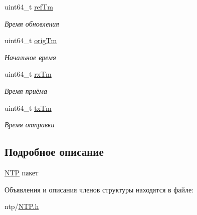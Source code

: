 \begin{DoxyCompactItemize}
\item 
\mbox{\label{structntp__packet_a14e1f9d8c88659f372942fe7e016df75}} 
uint64\+\_\+t \mbox{\hyperlink{structntp__packet_a14e1f9d8c88659f372942fe7e016df75}{ref\+Tm}}
\begin{DoxyCompactList}\small\item\em Время обновления \end{DoxyCompactList}\item 
\mbox{\label{structntp__packet_aa6c139817877455661b10e09375a7f7b}} 
uint64\+\_\+t \mbox{\hyperlink{structntp__packet_aa6c139817877455661b10e09375a7f7b}{orig\+Tm}}
\begin{DoxyCompactList}\small\item\em Начальное время \end{DoxyCompactList}\item 
\mbox{\label{structntp__packet_a21f08d8faa296fa970c8dc67a82c3526}} 
uint64\+\_\+t \mbox{\hyperlink{structntp__packet_a21f08d8faa296fa970c8dc67a82c3526}{rx\+Tm}}
\begin{DoxyCompactList}\small\item\em Время приёма \end{DoxyCompactList}\item 
\mbox{\label{structntp__packet_a206a3cd9d5dd05da7ce75d4e26e48fa3}} 
uint64\+\_\+t \mbox{\hyperlink{structntp__packet_a206a3cd9d5dd05da7ce75d4e26e48fa3}{tx\+Tm}}
\begin{DoxyCompactList}\small\item\em Время отправки \end{DoxyCompactList}\end{DoxyCompactItemize}


\subsection{Подробное описание}
\mbox{\hyperlink{classNTP}{N\+TP}} пакет 

Объявления и описания членов структуры находятся в файле\+:\begin{DoxyCompactItemize}
\item 
ntp/\mbox{\hyperlink{NTP_8h}{N\+T\+P.\+h}}\end{DoxyCompactItemize}

